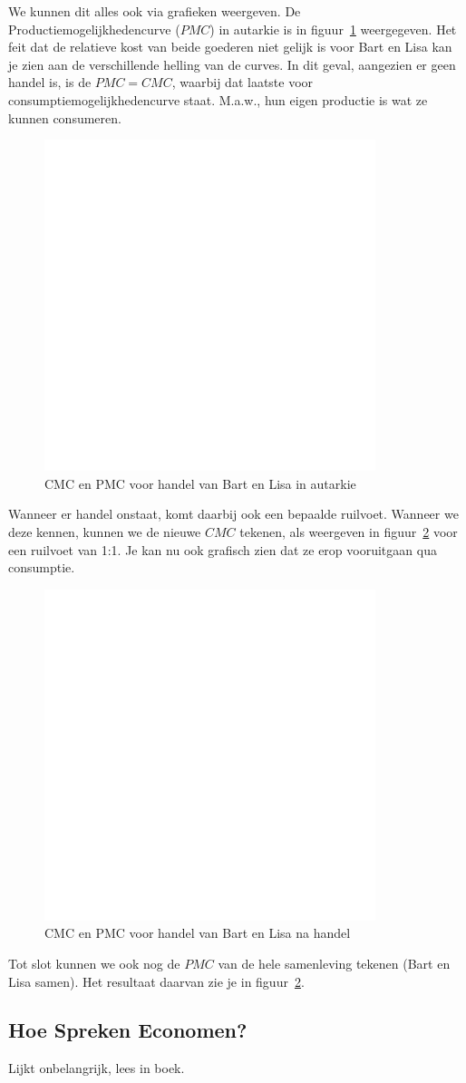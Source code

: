We kunnen dit alles ook via grafieken weergeven. De Productiemogelijkhedencurve ($PMC$) in autarkie is in figuur~\ref{fig:cmcEnPmcAutarkie} weergegeven. Het feit dat de relatieve kost van beide goederen niet gelijk is voor Bart en Lisa kan je zien aan de verschillende helling van de curves. In dit geval, aangezien er geen handel is, is de $PMC = CMC$, waarbij dat laatste voor consumptiemogelijkhedencurve staat. M.a.w., hun eigen productie is wat ze kunnen consumeren.
\begin{figure}[htbp]
	\centering
	\includegraphics[scale=0.4]{Images/white.png}
	\caption{CMC en PMC voor handel van Bart en Lisa in autarkie}
	\label{fig:cmcEnPmcAutarkie}
\end{figure}

Wanneer er handel onstaat, komt daarbij ook een bepaalde ruilvoet. Wanneer we deze kennen, kunnen we de nieuwe $CMC$ tekenen, als weergeven in figuur~\ref{fig:cmcHandel} voor een ruilvoet van 1:1. Je kan nu ook grafisch zien dat ze erop vooruitgaan qua consumptie.
\begin{figure}[htbp]
	\centering
	\includegraphics[scale=0.4]{Images/white.png}
	\caption{CMC en PMC voor handel van Bart en Lisa na handel}
	\label{fig:cmcHandel}
\end{figure}

Tot slot kunnen we ook nog de $PMC$ van de hele samenleving tekenen (Bart en Lisa samen). Het resultaat daarvan zie je in figuur~\ref{fig:cmcHandel}.


\subsection{Hoe Spreken Economen?}
Lijkt onbelangrijk, lees in boek.
